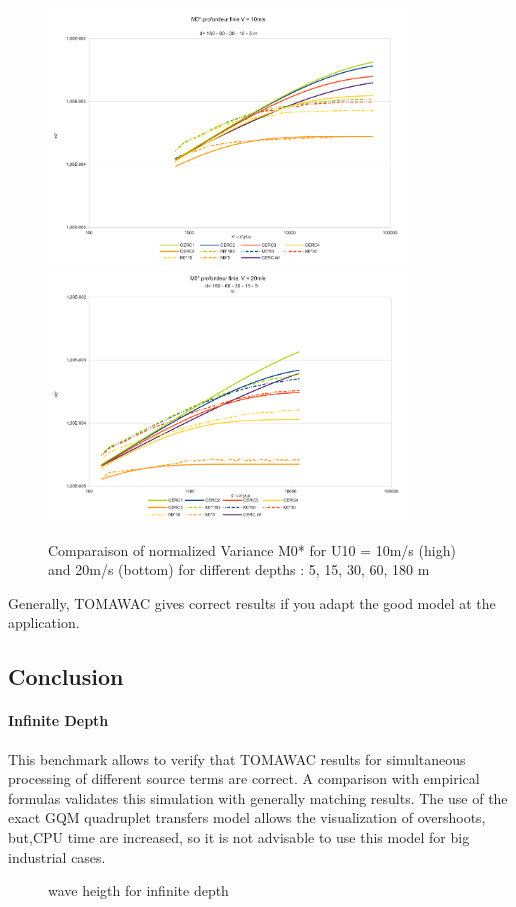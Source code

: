 \begin{figure}
\centering
\includegraphics[width=0.85\textwidth]{m0_test7v10.pdf}\\
\includegraphics[width=0.85\textwidth]{m0_test7v20.pdf}\\
\caption{Comparaison of normalized Variance M0* for U10 = 10m/s (high) and 20m/s (bottom) for different depths : 5, 15, 30, 60, 180 m}
\label{variancem0}
\end{figure}
Generally, TOMAWAC gives correct results if you adapt the good model at the application.
\subsection{Conclusion}
\paragraph{Infinite Depth}
This benchmark allows to verify that TOMAWAC results for simultaneous processing of different source terms are correct. A comparison with empirical formulas validates this simulation with generally matching results. The use of the exact GQM quadruplet transfers model allows the visualization of overshoots, but,CPU time are increased, so it is not advisable to use this model for big industrial cases.
\begin{figure}[h!]
\label{resultinfinite}
  \centering
      \caption{wave heigth for infinite depth}
\end{figure}

